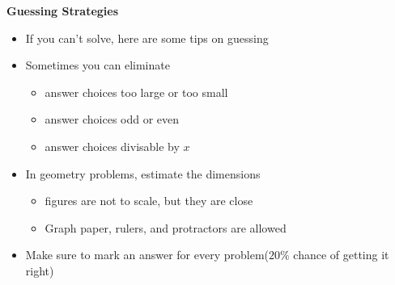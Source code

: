 \documentclass[11pt,letterpaper]{article}
\begin{document}
\begin{minipage}{\textwidth}
     \noindent \textbf{Guessing Strategies}
     \begin{itemize}
          \item If you can’t solve, here are some tips on guessing
          \item Sometimes you can eliminate
          \begin{itemize}
               \item answer choices too large or too small
               \item answer choices odd or even
               \item answer choices divisable by $x$
          \end{itemize}
          \item In geometry problems, estimate the dimensions
          \begin{itemize}
               \item figures are not to scale, but they are close
               \item Graph paper, rulers, and protractors are allowed
          \end{itemize}
          \item Make sure to mark an answer for every problem($20\%$ chance of getting it right)
        \end{itemize}
\end{minipage}
\end{document}
